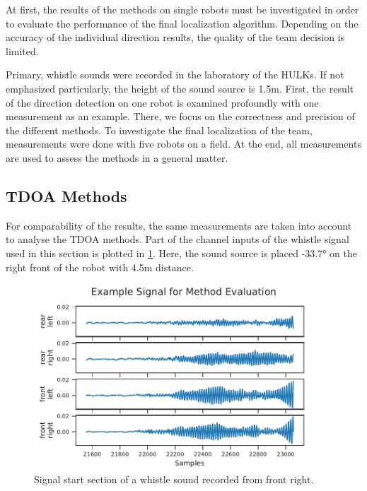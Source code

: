 At first, the results of the methods on single robots must be investigated
in order to evaluate the performance of the final localization algorithm.
Depending on the accuracy of the individual direction results, the quality
of the team decision is limited.

Primary, whistle sounds were recorded in the laboratory of the HULKs.
If not emphasized particularly, the height of the sound source is 1.5\si{m}.
First, the result of the direction detection on one robot
is examined profoundly with one measurement as an example.
There, we focus on the correctness and precision of the different methods.
To investigate the final localization of the team, measurements were
done with five robots on a field.
At the end, all measurements are used to assess the methods in a general matter.

\subsection{\ac{TDOA} Methods}

For comparability of the results, the same measurements are taken into
account to analyse the \ac{TDOA} methods.
Part of the channel inputs of the whistle signal used in this section is plotted
in \ref{fig:04_tdoaSignal}.
Here, the sound source is placed -33.7\si{\degree} on the right front
of the robot with 4.5\si{m} distance.
\begin{figure}[ht]
	\centering
		\includegraphics[]{figures/evaluation/cc_frontRight_1_signal}
	\caption{Signal start section of a whistle sound recorded from front right.}
	\label{fig:04_tdoaSignal}
\end{figure}

